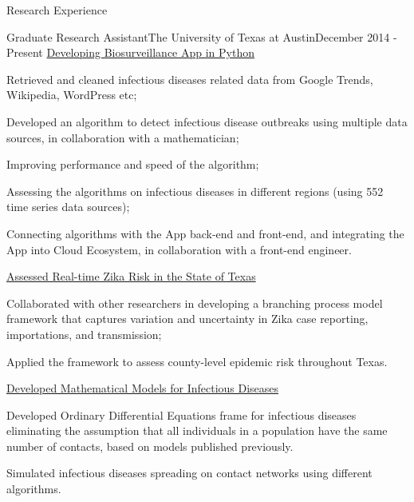 \documentclass{my_resume} %
\begin{document}

\begin{rSection}{Research Experience}

\begin{rSubsection}{Graduate Research Assistant}{The
    University of Texas at Austin}{December 2014 - Present}
  \underline{Developing Biosurveillance App in Python}
  \item Retrieved and cleaned infectious diseases related data from Google
    Trends, Wikipedia, WordPress etc;
  \item Developed an algorithm to detect infectious disease outbreaks using
    multiple data sources, in collaboration with a mathematician;
  \item Improving performance and speed of the algorithm;
  \item Assessing the algorithms on infectious diseases in different regions
    (using 552 time series data sources);
  \item Connecting algorithms with the App back-end and front-end, and
    integrating the App into Cloud Ecosystem, in collaboration with a front-end
    engineer.

  \underline{Assessed Real-time Zika Risk in the State of Texas}
  \item Collaborated with other researchers in developing a branching process
    model framework that captures variation and uncertainty in Zika case
    reporting, importations, and transmission;
  \item Applied the framework to assess county-level epidemic risk throughout
    Texas.

  \underline{Developed Mathematical Models for Infectious Diseases}
  \item Developed Ordinary Differential Equations frame for infectious diseases
    eliminating the assumption that all individuals in a population have the
    same number of contacts, based on models published previously.
  \item Simulated infectious diseases spreading on contact networks using
    different algorithms.
\end{rSubsection}
\end{rSection}

\end{document}
